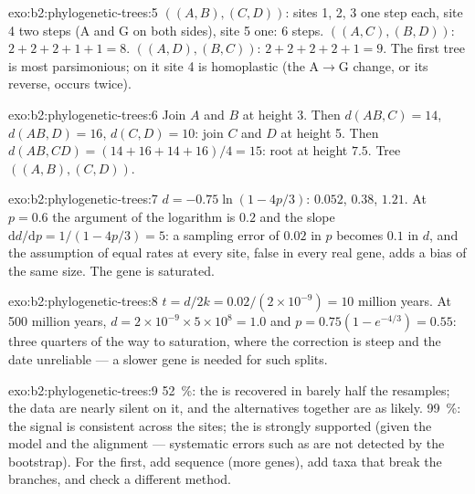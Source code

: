 \begin{solution}{exo:b2:phylogenetic-trees:5}
$((A,B),(C,D))$: sites 1, 2, 3 one step each, site 4 two steps
($\mathrm{A}$ and $\mathrm{G}$ on both sides), site 5 one: 6 steps.
$((A,C),(B,D))$: $2 + 2 + 2 + 1 + 1 = 8$. $((A,D),(B,C))$: $2 + 2 + 2 +
2 + 1 = 9$. The first tree is most parsimonious; on it site 4 is
homoplastic (the $\mathrm{A}\to\mathrm{G}$ change, or its reverse,
occurs twice).
\end{solution}

\begin{solution}{exo:b2:phylogenetic-trees:6}
Join $A$ and $B$ at height 3. Then $d(AB,C) = 14$, $d(AB,D) = 16$,
$d(C,D) = 10$: join $C$ and $D$ at height 5. Then $d(AB,CD) = (14 + 16
+ 14 + 16)/4 = 15$: root at height $7.5$. Tree $((A,B),(C,D))$.
\end{solution}

\begin{solution}{exo:b2:phylogenetic-trees:7}
$d = -0.75\ln(1 - 4p/3)$: $0.052$, $0.38$, $1.21$. At $p = 0.6$ the
argument of the logarithm is $0.2$ and the slope $\mathrm{d}d/\mathrm{d}p
= 1/(1 - 4p/3) = 5$: a sampling error of $0.02$ in $p$ becomes
$0.1$ in $d$, and the assumption of equal rates at every site,
false in every real gene, adds a bias of the same size. The gene
is saturated.
\end{solution}

\begin{solution}{exo:b2:phylogenetic-trees:8}
$t = d/2k = 0.02/(2\times 10^{-9}) = 10$ million years. At 500
million years, $d = 2\times 10^{-9}\times 5\times 10^{8} = 1.0$ and
$p = 0.75(1 - e^{-4/3}) = 0.55$: three quarters of the way to
saturation, where the correction is steep and the date unreliable
--- a slower gene is needed for such splits.
\end{solution}

\begin{solution}{exo:b2:phylogenetic-trees:9}
\qty{52}{\%}: the  is recovered in barely half the resamples;
the data are nearly silent on it, and the alternatives together
are as likely. \qty{99}{\%}: the signal is consistent across the
sites; the  is strongly supported (given the model and the
alignment --- systematic errors such as  are
not detected by the bootstrap). For the first, add sequence (more
genes), add taxa that break the branches, and check a different
method.
\end{solution}

